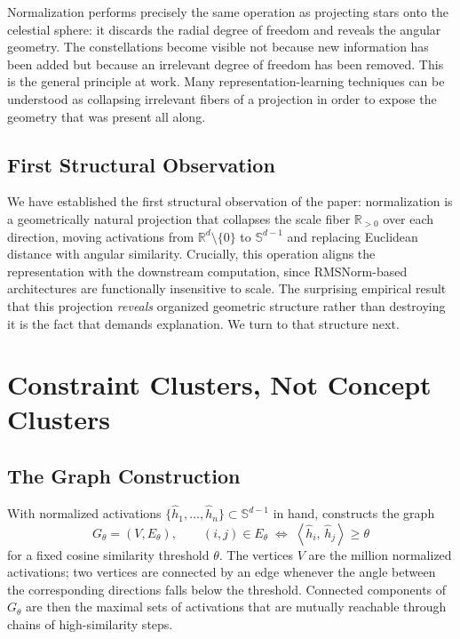\documentclass[12pt, a4paper]{article}
\theoremstyle{plain}
\theoremstyle{definition}
\theoremstyle{remark}
\newcommand{\R}{\mathbb{R}}
\newcommand{\Sph}{\mathbb{S}}
\newcommand{\ip}[2]{\left\langle #1,\, #2 \right\rangle}
\newcommand{\hh}{\hat{h}}
\begin{document}
Normalization performs precisely the same operation as projecting stars onto
the celestial sphere: it discards the radial degree of freedom and reveals the
angular geometry. The constellations become visible not because new information
has been added but because an irrelevant degree of freedom has been removed.
This is the general principle at work. Many representation-learning techniques
\cite{coifman2006diffusion, tenenbaum2000isomap} can be understood as
collapsing irrelevant fibers of a projection in order to expose the geometry
that was present all along.

\subsection{First Structural Observation}

We have established the first structural observation of the paper:
normalization is a geometrically natural projection that collapses the
scale fiber $\R_{>0}$ over each direction, moving activations from
$\R^d \setminus \{0\}$ to $\Sph^{d-1}$ and replacing Euclidean distance with
angular similarity. Crucially, this operation aligns the representation with
the downstream computation, since RMSNorm-based architectures are functionally
insensitive to scale. The surprising empirical result that this projection
\emph{reveals} organized geometric structure rather than destroying it
is the fact that demands explanation. We turn to that structure next.

\section{Constraint Clusters, Not Concept Clusters}

\subsection{The Graph Construction}

With normalized activations $\{\hh_1, \ldots, \hh_n\} \subset \Sph^{d-1}$
in hand, \cite{liu2026normgeometry} constructs the graph
\begin{equation}
  G_\theta = (V, E_\theta),
  \qquad
  (i,j) \in E_\theta \;\iff\; \ip{\hh_i}{\hh_j} \geq \theta
\end{equation}
for a fixed cosine similarity threshold $\theta$. The vertices $V$ are the
million normalized activations; two vertices are connected by an edge whenever
the angle between the corresponding directions falls below the threshold.
Connected components of $G_\theta$ are then the maximal sets of activations
that are mutually reachable through chains of high-similarity steps.
\end{document}
